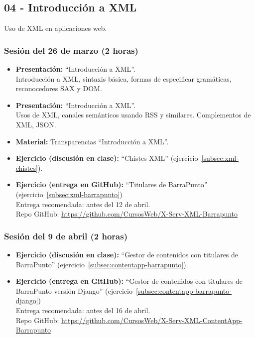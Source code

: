 \documentclass[a4paper,12pt]{article}
\begin{document}
\subsection{04 - Introducción a XML}

Uso de XML en aplicaciones web.

\subsubsection{Sesión del 26 de marzo (2 horas)}

\begin{itemize}
\item \textbf{Presentación:} ``Introducción a XML''. \\
 Introducción a XML, sintaxis básica, formas de especificar gramáticas, reconocedores SAX y DOM.
\item \textbf{Presentación:} ``Introducción a XML''. \\
Usos de XML, canales semánticos usando RSS y similares. Complementos de XML, JSON.
\item \textbf{Material:} Transparencias ``Introducción a XML''.
\item \textbf{Ejercicio (discusión en clase):} ``Chistes XML'' (ejercicio~\ref{subsec:xml-chistes}).
\item \textbf{Ejercicio (entrega en GitHub):} ``Titulares de BarraPunto'' (ejercicio~\ref{subsec:xml-barrapunto}) \\
  Entrega recomendada: antes del 12 de abril. \\
  Repo GitHub: \url{https://github.com/CursosWeb/X-Serv-XML-Barrapunto}
\end{itemize}

\subsubsection{Sesión del 9 de abril (2 horas)}

\begin{itemize}
\item \textbf{Ejercicio (discusión en clase):} ``Gestor de contenidos con titulares de BarraPunto'' (ejercicio~\ref{subsec:contentapp-barrapunto}). 
\item \textbf{Ejercicio (entrega en GitHub):} ``Gestor de contenidos con titulares de BarraPunto versión Django'' (ejercicio~\ref{subsec:contentapp-barrapunto-django}) \\
  Entrega recomendada: antes del 16 de abril. \\
  Repo GitHub: \url{https://github.com/CursosWeb/X-Serv-XML-ContentApp-Barrapunto}
\end{itemize}
\end{document}
